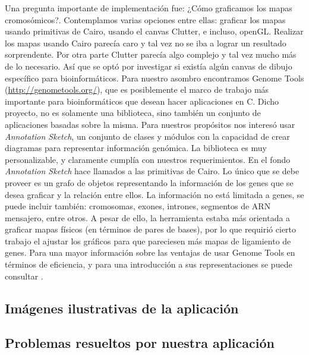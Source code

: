 \documentclass{article}
\begin{document}
	Una pregunta importante de implementación fue: ¿Cómo graficamos los mapas cromosómicos?. Contemplamos varias opciones entre ellas: graficar los mapas usando primitivas de Cairo, usando el canvas Clutter, e incluso, openGL. Realizar los mapas usando Cairo parecía caro y tal vez no se iba a lograr un resultado sorprendente. Por otra parte Clutter parecía algo complejo y tal vez mucho más de lo necesario. Así que se optó por investigar si existía algún canvas de dibujo específico para bioinformáticos. Para nuestro asombro encontramos Genome Tools (\url{http://genometools.org/}), que es posiblemente el marco de trabajo más importante para bioinformáticos que desean hacer aplicaciones en C. Dicho proyecto, no es solamente una biblioteca, sino también un conjunto de aplicaciones basadas sobre la misma. Para nuestros propósitos nos interesó usar \emph{Annotation Sketch}, un conjunto de clases y módulos con la capacidad de crear diagramas para representar información genómica. La biblioteca es muy personalizable, y claramente cumplía con nuestros requerimientos. En el fondo \emph{Annotation Sketch} hace llamados a las primitivas de Cairo. Lo único que se debe proveer es un grafo de objetos representando la información de los genes que se desea graficar y la relación entre ellos. La información no está limitada a genes, se puede incluir también: cromosomas, exones, intrones, segmentos de ARN mensajero, entre otros. A pesar de ello, la herramienta estaba más orientada a graficar mapas físicos (en términos de pares de bases), por lo que requirió cierto trabajo el ajustar los gráficos para que pareciesen más mapas de ligamiento de genes. Para una mayor información sobre las ventajas de usar Genome Tools en términos de eficiencia, y para una introducción a sus representaciones se puede consultar \cite{gremme2013genometools}.
	
	
	
	\subsection{Imágenes ilustrativas de la aplicación}
	
	
	\subsection{Problemas resueltos por nuestra aplicación}
	
\end{document}
